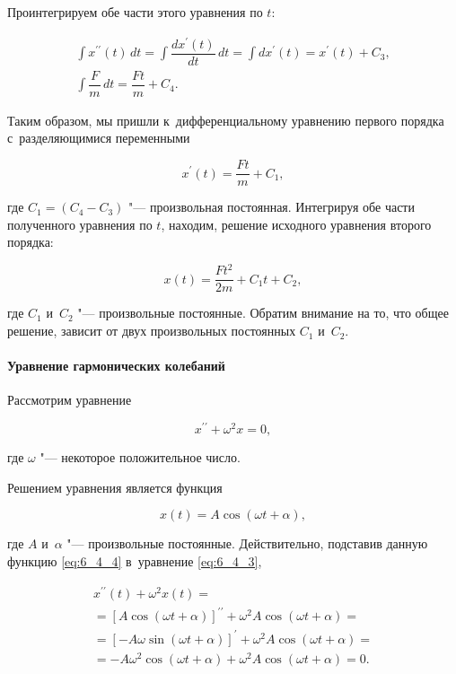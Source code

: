 \noindent
Проинтегрируем обе части этого уравнения по $t$:

\begin{gather*}
\int x^{\prime\prime} (t) \, dt = \int \dfrac{dx^\prime (t)}{dt} \, dt =
\int dx^\prime (t) = x^\prime (t) + C_{3}, \\
\int \dfrac{F}{m} \, dt = \dfrac{Ft}{m} + C_{4}.
\end{gather*}

\noindent
Таким образом, мы пришли к~дифференциальному уравнению первого порядка с~разделяющимися
переменными

\begin{equation*}
x^\prime (t) = \dfrac{Ft}{m} + C_{1},
\end{equation*}

\noindent
где $C_{1} = (C_{4} - C_{3})$ "--- произвольная постоянная. Интегрируя обе части
полученного уравнения по $t$, находим, решение исходного уравнения второго порядка:

\begin{equation*}
x(t) = \dfrac{Ft^{2}}{2m} + C_{1}t + C_{2},
\end{equation*}

\noindent
где $C_{1}$ и~$C_{2}$ "--- произвольные постоянные. Обратим внимание на то,
что общее решение, зависит от двух произвольных постоянных $C_{1}$ и~$C_{2}$.

\paragraph{Уравнение гармонических колебаний}
Рассмотрим уравнение

\begin{equation}\label{eq:6_4_3}
x^{\prime\prime} + \omega^{2}x = 0,
\end{equation}

\noindent
где $\omega$ "--- некоторое положительное число.

Решением уравнения является функция

\begin{equation}\label{eq:6_4_4}
x(t) = A \cos (\omega t + \alpha),
\end{equation}

\noindent
где $A$ и~$\alpha$ "--- произвольные постоянные. Действительно, подставив
данную функцию \eqref{eq:6_4_4} в~уравнение \eqref{eq:6_4_3},

\begin{multline*}
x^{\prime\prime} (t) + \omega^{2} x(t) = \\
= \left[ A \cos (\omega t + \alpha) \right]^{\prime\prime} +
\omega^{2} A \cos (\omega t + \alpha) = \\
= \left[ -A \omega \sin (\omega t + \alpha) \right]^{\prime} +
\omega^{2} A \cos (\omega t + \alpha) = \\
= -A \omega^{2} \cos (\omega t + \alpha) + \omega^{2} A \cos (\omega t + \alpha) = 0 .
\end{multline*}

